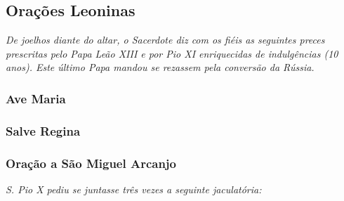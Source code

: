 \subsection{Orações Leoninas}

\emph{De joelhos diante do altar, o Sacerdote diz com os fiéis as seguintes preces prescritas pelo Papa Leão XIII e por Pio XI enriquecidas de indulgências (10 anos). Este último Papa mandou se rezassem pela conversão da Rússia.}

\subsubsection{Ave Maria}\label{avemaria}


\subsubsection{Salve Regina}\label{antsalveregina}


\subsubsection{Oração a São Miguel Arcanjo}\label{saomiguel}


\emph{S. Pio X pediu se juntasse três vezes a seguinte jaculatória:}\par

\begin{paracol}{2}\switchcolumn{}\switchcolumn*{}\switchcolumn{}\end{paracol}
